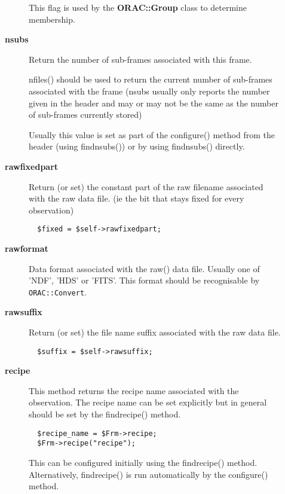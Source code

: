 \begin{description}
\begin{description}
This flag is used by the \textbf{ORAC::Group} class to determine membership.


\item[{\textbf{nsubs}}] \mbox{}

Return the number of sub-frames associated with this frame.



nfiles() should be used to return the current number of sub-frames
associated with the frame (nsubs usually only reports the number given
in the header and may or may not be the same as the number of
sub-frames currently stored)



Usually this value is set as part of the configure() method from the
header (using findnsubs()) or by using findnsubs() directly.


\item[{\textbf{rawfixedpart}}] \mbox{}

Return (or set) the constant part of the raw filename associated
with the raw data file. (ie the bit that stays fixed for every
observation)

\begin{verbatim}
  $fixed = $self->rawfixedpart;
\end{verbatim}

\item[{\textbf{rawformat}}] \mbox{}

Data format associated with the raw() data file.
Usually one of 'NDF', 'HDS' or 'FITS'. This format should be
recognisable by \texttt{ORAC::Convert}.


\item[{\textbf{rawsuffix}}] \mbox{}

Return (or set) the file name suffix associated with
the raw data file.

\begin{verbatim}
  $suffix = $self->rawsuffix;
\end{verbatim}

\item[{\textbf{recipe}}] \mbox{}

This method returns the recipe name associated with the observation.
The recipe name can be set explicitly but in general should be
set by the findrecipe() method.

\begin{verbatim}
  $recipe_name = $Frm->recipe;
  $Frm->recipe("recipe");
\end{verbatim}


This can be configured initially using the findrecipe() method.
Alternatively, findrecipe() is run automatically by the configure()
method.



\end{description}
\end{description}

